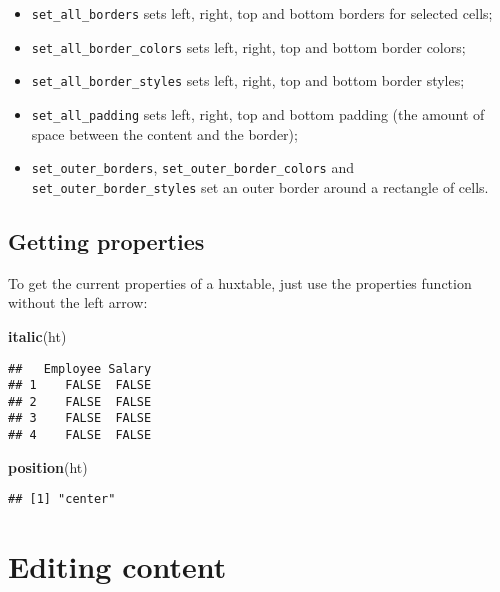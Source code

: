 \documentclass[]{article}
\newenvironment{Shaded}{\begin{snugshade}}{\end{snugshade}}
\newcommand{\KeywordTok}[1]{\textcolor[rgb]{0.13,0.29,0.53}{\textbf{#1}}}
\newcommand{\NormalTok}[1]{#1}
\providecommand{\tightlist}{%
  \setlength{\itemsep}{0pt}\setlength{\parskip}{0pt}}
\begin{document}
\begin{itemize}
\tightlist
\item
  \texttt{set\_all\_borders} sets left, right, top and bottom borders
  for selected cells;
\item
  \texttt{set\_all\_border\_colors} sets left, right, top and bottom
  border colors;
\item
  \texttt{set\_all\_border\_styles} sets left, right, top and bottom
  border styles;
\item
  \texttt{set\_all\_padding} sets left, right, top and bottom padding
  (the amount of space between the content and the border);
\item
  \texttt{set\_outer\_borders}, \texttt{set\_outer\_border\_colors} and
  \texttt{set\_outer\_border\_styles} set an outer border around a
  rectangle of cells.
\end{itemize}

\hypertarget{getting-properties}{%
\subsection{Getting properties}\label{getting-properties}}

To get the current properties of a huxtable, just use the properties
function without the left arrow:

\begin{Shaded}
\begin{Highlighting}[]
\KeywordTok{italic}\NormalTok{(ht)}
\end{Highlighting}
\end{Shaded}

\begin{verbatim}
##   Employee Salary
## 1    FALSE  FALSE
## 2    FALSE  FALSE
## 3    FALSE  FALSE
## 4    FALSE  FALSE
\end{verbatim}

\begin{Shaded}
\begin{Highlighting}[]
\KeywordTok{position}\NormalTok{(ht)}
\end{Highlighting}
\end{Shaded}

\begin{verbatim}
## [1] "center"
\end{verbatim}

\FloatBarrier

\hypertarget{editing-content}{%
\section{Editing content}\label{editing-content}}
\end{document}
